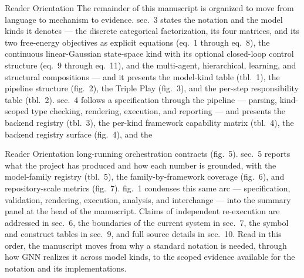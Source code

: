 \documentclass[
  ignorenonframetext,
]{beamer}
\begin{document}
\begin{frame}[allowframebreaks]{Reader Orientation}
\protect{}\label{reader-orientation}
The remainder of this manuscript is organized to move from language to
mechanism to evidence. sec.~3 states the notation
and the model kinds it denotes --- the discrete categorical
factorization, its four matrices, and its two free-energy objectives as
explicit equations (eq.~1 through
eq.~8), the continuous linear-Gaussian state-space kind
with its optional closed-loop control structure
(eq.~9 through eq.~11), and the
multi-agent, hierarchical, learning, and structural compositions --- and
it presents the model-kind table (tbl.~1), the
pipeline structure (fig.~2), the Triple Play
(fig.~3), and the per-step responsibility table
(tbl.~2). sec.~4 follows a
specification through the pipeline --- parsing, kind-scoped type
checking, rendering, execution, and reporting --- and presents the
backend registry (tbl.~3), the per-kind
framework capability matrix (tbl.~4), the
backend registry surface (fig.~4), and the
\end{frame}

\begin{frame}[allowframebreaks]{Reader Orientation}
long-running orchestration contracts (fig.~5).
sec.~5 reports what the project has produced
and how each number is grounded, with the model-family registry
(tbl.~5), the family-by-framework coverage
(fig.~6), and repository-scale metrics
(fig.~7). fig.~1
condenses this same arc --- specification, validation, rendering,
execution, analysis, and interchange --- into the summary panel at the
head of the manuscript. Claims of independent re-execution are addressed
in sec.~6, the boundaries of the current system
in sec.~7, the symbol and construct
tables in sec.~9, and full source details in
sec.~10. Read in this order, the manuscript moves from
why a standard notation is needed, through how GNN realizes it across
model kinds, to the scoped evidence available for the notation and its
implementations.
\end{frame}
\end{document}
